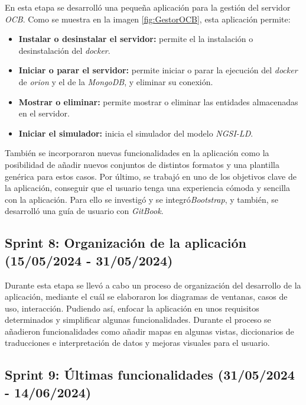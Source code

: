 En esta etapa se desarrolló una pequeña aplicación para la gestión del servidor \textit{OCB}. Como se muestra en la imagen \ref{fig:GestorOCB}, esta aplicación permite:
\begin{itemize}
    \item \textbf{Instalar o desinstalar el servidor:} permite el la instalación o desinstalación del \textit{docker}.
    \item \textbf{Iniciar o parar el servidor:} permite iniciar o parar la ejecución del \textit{docker} de \textit{orion} y el de la \textit{MongoDB}, y eliminar su conexión.
    \item \textbf{Mostrar o eliminar:} permite mostrar o eliminar las entidades almacenadas en el servidor.
    \item \textbf{Iniciar el simulador:} inicia el simulador del modelo \textit{NGSI-LD}.
\end{itemize}

También se incorporaron nuevas funcionalidades en la aplicación como la posibilidad de añadir nuevos conjuntos de distintos formatos y una plantilla genérica para estos casos.
Por último, se trabajó en uno de los objetivos clave de la aplicación, conseguir que el usuario tenga una experiencia cómoda y sencilla con la aplicación. Para ello se investigó y se integró\textit{Bootstrap}, y también, se desarrolló una guía de usuario con \textit{GitBook}.


\subsection{Sprint 8: Organización de la aplicación (15/05/2024 - 31/05/2024)}

Durante esta etapa se llevó a cabo un proceso de organización del desarrollo de la aplicación, mediante el cuál se elaboraron los diagramas de ventanas, casos de uso, interacción. Pudiendo así, enfocar la aplicación en unos requisitos determinados y simplificar algunas funcionalidades.
Durante el proceso se añadieron funcionalidades como añadir mapas en algunas vistas, diccionarios de traducciones e interpretación de datos y mejoras visuales para el usuario.


\subsection{Sprint 9: Últimas funcionalidades (31/05/2024 - 14/06/2024)}

